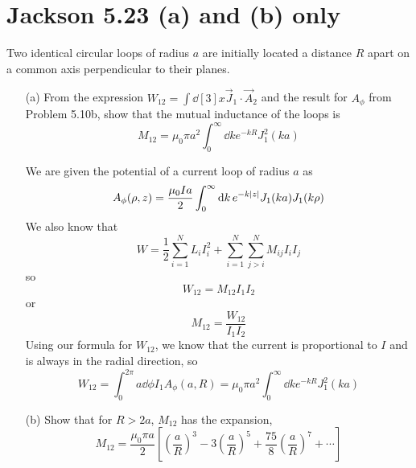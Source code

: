 \documentclass[a4paper,twoside]{article}
\begin{document}
\section{Jackson 5.23 (a) and (b) only}
Two identical circular loops of radius $ a $ are initially located a distance $ R $ apart on a common axis perpendicular to their planes.
\begin{itemize}
    \item[(a)] From the expression $ W_{12} = \int \dd[3]{x} \vec{J}_1 \cdot \vec{A}_2 $ and the result for $ A_{\phi} $ from Problem 5.10b, show that the mutual inductance of the loops is
        \begin{equation}
            M_{12} = \mu_0 \pi a^2 \int_{0}^{\infty} \dd{k} e^{-kR} J_1^2(ka)
        \end{equation}
        \begin{problem}
           We are given the potential of a current loop of radius $ a $ as
           \begin{equation}
               A_{\phi}(\rho, z) = \frac{\mu_0 I a}{2} \int_{0}^{\infty} \dd{k} e^{-k \abs{z}} J_1(ka)J_1(k \rho)
           \end{equation}
           We also know that
           \begin{equation}
               W = \frac{1}{2} \sum_{i=1}^{N} L_i I_i^2 + \sum_{i=1}^{N} \sum_{j>i}^{N} M_{ij} I_i I_j
           \end{equation}
           so
           \begin{equation}
               W_{12} = M_{12} I_1 I_2
           \end{equation}
           or
           \begin{equation}
               M_{12} = \frac{W_{12}}{I_1 I_2}
           \end{equation}
           Using our formula for $ W_{12} $, we know that the current is proportional to $ I $ and is always in the radial direction, so
           \begin{equation}
               W_{12} = \int_{0}^{2 \pi} a \dd{\phi} I_1 A_{\phi}(a, R) = \mu_0 \pi a^2 \int_{0}^{\infty} \dd{k} e^{-kR} J_1^2(ka)
           \end{equation}
        \end{problem}
    \item[(b)] Show that for $ R > 2a $, $ M_{12} $ has the expansion,
        \begin{equation}
            M_{12} = \frac{\mu_0 \pi a}{2} \left[ \left( \frac{a}{R} \right)^3 - 3 \left( \frac{a}{R} \right)^5 + \frac{75}{8} \left( \frac{a}{R} \right)^7 + \cdots \right]

\end{equation}
\end{itemize}
\end{document}
